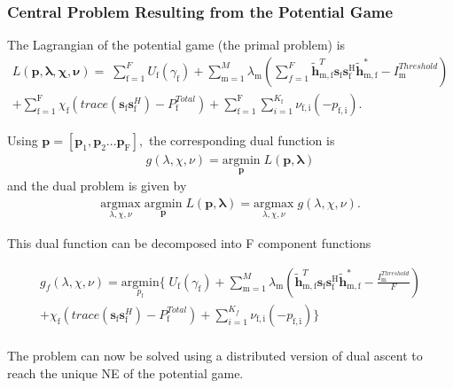 \documentclass[12pt,a4paper]{report}
\begin{document}
\subsubsection{Central Problem Resulting from the Potential Game}
The Lagrangian of the potential game (the primal problem) is
\begin{multline}
L(\mathbf{\mathbf{p},\lambda,\chi,\nu}) = 
\;
\sum_{\text{f}=1}^F U_{\text{f}}(\gamma_{\text{f}}) 
+
\sum_{\mathrm{m=1}}^M \lambda_{\mathrm{m}}
(	  \sum^F_{f=1} \mathbf{\tilde{h}}_{\mathrm{m,f}}^T  \mathbf{s}_{\mathrm{f}} 						
	\mathbf{s_{\mathrm{f}}^{\mathrm{H}}} \mathbf{\tilde{h}_{\mathrm{m,f}}^*} - I^{Threshold}		
	_{\mathrm{m}} )
\\
+ 
\sum_{\text{f}=1}^\text{F}
\chi_{\mathrm{f}}(trace(\mathbf{s}_\mathrm{f}\mathbf{s}_\mathrm{f}^H)-P^{Total}_{\text{f}} )
+
\sum_{\text{f}=1}^\text{F}
\sum_{i=1}^{K_{\text{f}}}
\nu_{\mathrm{f,i}}(-p_{\mathrm{f,i}}).
\end{multline}

Using $\mathbf{p}= [\mathbf{p}_1, \mathbf{p}_2...\mathbf{p}_{\text{F}}],$ the corresponding dual function is
\begin{gather*}
g(\lambda, \chi, \nu) = \underset{\mathbf{p}}{\mathrm{argmin}}\;L(\mathbf{\mathbf{p},\lambda})
\end{gather*}
and the dual problem is given by
\begin{gather*}
\underset{\lambda, \chi, \nu}{\mathrm{argmax}}\;\underset{\mathbf{p}}{\mathrm{argmin}}\;L(\mathbf{\mathbf{p},\lambda}) = \underset{\lambda, \chi, \nu}{\mathrm{argmax}}\;g(\lambda, \chi, \nu).
\end{gather*}

This dual function can be decomposed into F component functions


\begin{multline}
g_f(\lambda, \chi, \nu) = \underset{p_{\text{f}}}{\mathrm{argmin}}
\{
\;
U_{\text{f}}(\gamma_{\text{f}}) 
+
\sum_{\mathrm{m=1}}^M \lambda_{\mathrm{m}}
(\mathbf{\tilde{h}}_{\mathrm{m,f}}^T  \mathbf{s}_{\mathrm{f}} 						
	\mathbf{s_{\mathrm{f}}^{\mathrm{H}}} \mathbf{\tilde{h}_{\mathrm{m,f}}^*} - \frac{I^{Threshold}_{\mathrm{m}}}{F})
\\
+ 
\chi_{\mathrm{f}}(trace(\mathbf{s}_\mathrm{f}\mathbf{s}_\mathrm{f}^H)-P^{Total}_{\text{f}} )
+
\sum_{i=1}^{K_f}
\nu_{\mathrm{f,i}}(-p_{\mathrm{f,i}})\}
\end{multline}
\\

The problem can now be solved using a distributed version of dual ascent to reach the unique NE of the potential game. 
\end{document}
